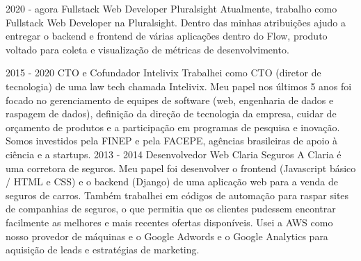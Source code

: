 
\cvevent
    {2020 - agora}
    {Fullstack Web Developer}
    {Pluralsight}
    {Atualmente, trabalho como Fullstack Web Developer na Pluralsight. Dentro das minhas atribuições
    ajudo a entregar o backend e frontend de várias aplicações dentro do Flow, produto voltado para coleta e visualização de
    métricas de desenvolvimento.}
    {}
    {}
    {}

\cvevent
    {2015 - 2020}
    {CTO e Cofundador}
    {Intelivix}
    {Trabalhei como CTO (diretor de tecnologia) de uma law tech chamada Intelivix. Meu papel nos últimos 5 anos foi focado no gerenciamento de equipes de software (web, engenharia de dados e raspagem de dados), definição da direção de tecnologia da empresa, cuidar de orçamento de produtos e a participação em programas de pesquisa e inovação. Somos investidos pela FINEP e pela FACEPE, agências brasileiras de apoio à ciência e a startups.}
    {}
    {}
    {}
\cvevent
    {2013 - 2014}
    {Desenvolvedor Web}
    {Claria Seguros}
    {A Claria é uma corretora de seguros. Meu papel foi desenvolver o frontend (Javascript básico / HTML e CSS) e o backend (Django) de uma aplicação web para a venda de seguros de carros. Também trabalhei em códigos de automação para raspar sites de companhias de seguros, o que permitia que os clientes pudessem encontrar facilmente as melhores e mais recentes ofertas disponíveis. Usei a AWS como nosso provedor de máquinas e o Google Adwords e o Google Analytics para aquisição de leads e estratégias de marketing.}
    {}
    {}
